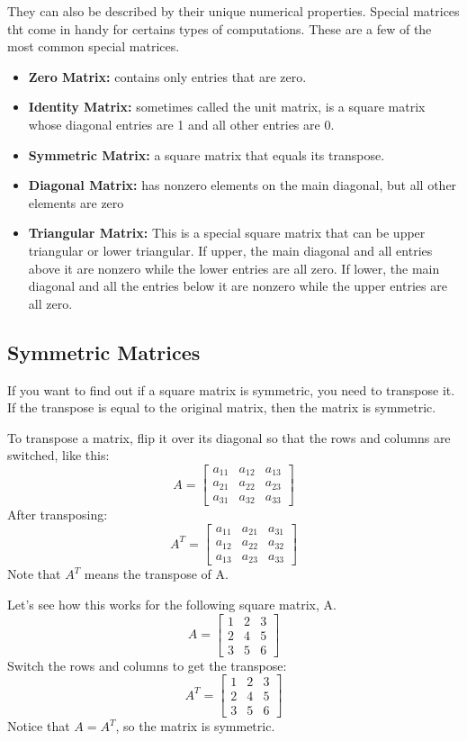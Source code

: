They can also be described by their unique numerical properties. Special matrices tht come in handy for certains types of computations. These are a few of the most common special matrices.
\begin{itemize}
	\item \textbf{Zero Matrix:} contains only entries that are zero.
	\item \textbf{Identity Matrix:} sometimes called the unit matrix, is a square matrix whose diagonal entries are 1 and all other entries are 0.
	\item \textbf{Symmetric Matrix:} a square matrix that equals its transpose.
	\item \textbf{Diagonal Matrix:} has nonzero elements on the main diagonal, but all other elements are zero
	\item \textbf{Triangular Matrix:} This is a special square matrix that can be upper triangular or lower triangular. If upper, the main diagonal and all entries above it are nonzero while the lower entries are all zero. If lower, the main diagonal and all the entries below it are nonzero while the upper entries are all zero. 
\end{itemize}

\subsection{Symmetric Matrices}
If you want to find out if a square matrix is symmetric, you need to transpose it. If the transpose is equal to the original matrix, then the matrix is symmetric.

To transpose a matrix, flip it over its diagonal so that the rows and columns are switched, like this:
$$
A = \begin{bmatrix}
a_{11} & a_{12} & a_{13} \\
a_{21} & a_{22} & a_{23} \\
a_{31} & a_{32} & a_{33}
\end{bmatrix}
$$
After transposing:
$$
A^T = \begin{bmatrix}
a_{11} & a_{21} & a_{31} \\
a_{12} & a_{22} & a_{32} \\
a_{13} & a_{23} & a_{33}
\end{bmatrix}
$$
Note that $A^T$ means the transpose of A. 

Let's see how this works for the following square matrix, A.
$$
A = \begin{bmatrix}
1 & 2 & 3 \\
2 & 4 & 5 \\
3 & 5 & 6
\end{bmatrix}
$$
Switch the rows and columns to get the transpose:
$$
A^T = \begin{bmatrix}
1 & 2 & 3 \\
2 & 4 & 5 \\
3 & 5 & 6
\end{bmatrix}
$$
Notice that $A = A^T$, so the matrix is symmetric.

